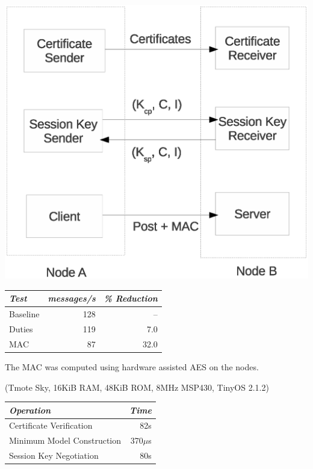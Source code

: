 \begin{center}
\includegraphics[scale=0.85]{SprocketRT-Protocol.eps}
\end{center}
\stopslide

\begin{center}
  \newcommand\T{\rule{0pt}{2.1ex}}
  \begin{tabular}{|l|r|r|} \hline
    \textit{Test} \T & \textit{messages/s} & \textit{\% Reduction} \\
    \hline \hline

    Baseline \T & 128 &   -- \\ \hline 
    Duties   \T & 119 &  7.0 \\ \hline
    MAC      \T &  87 & 32.0 \\ \hline
  \end{tabular}
\end{center}

The MAC was computed using hardware assisted AES on the nodes.

(Tmote Sky, 16KiB RAM, 48KiB ROM, 8MHz MSP430, TinyOS 2.1.2)
\stopslide

\begin{center}
  \newcommand\T{\rule{0pt}{2.1ex}}
  \begin{tabular}{|l|r|} \hline
    \textit{Operation} \T & \textit{Time} \\ \hline \hline

    Certificate Verification     \T &  82s \\ \hline 
    Minimum Model Construction   \T & 370$\mu$s \\ \hline
    Session Key Negotiation      \T &  80s\\ \hline
  \end{tabular}
\end{center}

